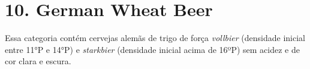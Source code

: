 \section*{10. German Wheat Beer}

Essa categoria contém cervejas alemãs de trigo de força \textit{vollbier} (densidade inicial entre 11°P e 14°P) e \textit{starkbier} (densidade inicial acima de 16ºP) sem acidez e de cor clara e escura.
